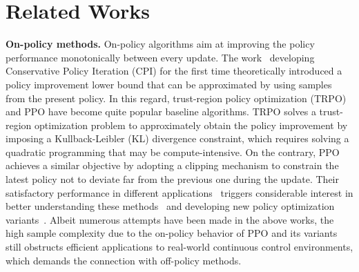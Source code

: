 \section{Related Works}
\textbf{On-policy methods.}
On-policy algorithms aim at improving the policy performance monotonically between every update. The work~\cite{kakade2002approximately} developing Conservative Policy Iteration (CPI) for the first time theoretically introduced a policy improvement lower bound that can be approximated by using samples from the present policy. In this regard, trust-region policy optimization (TRPO)~\cite{schulman2015trust} and PPO have become quite popular baseline algorithms. TRPO solves a trust-region optimization problem to approximately obtain the policy improvement by imposing a Kullback-Leibler (KL) divergence constraint, which
requires solving a quadratic programming that may be compute-intensive. On the contrary, PPO achieves a similar objective by adopting a clipping mechanism to constrain the latest policy not to deviate far from the previous one during the update. Their satisfactory performance in different applications~\cite{hu2019towards,lele2020stock,zhang2022ppo,dutta2022survey,bahrpeyma2023application,nguyen2024modelling,zhang2020power} triggers considerable interest in better understanding these methods~\cite{jin2023stationary} and developing new policy optimization variants~\cite{huang2021neural}.
Albeit numerous attempts have been made in the above works, the high sample complexity due to the on-policy behavior of PPO and its variants still obstructs efficient applications to real-world continuous control environments, which demands the connection with off-policy methods.

